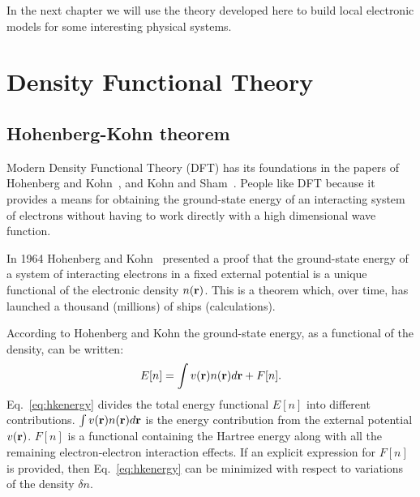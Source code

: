 In the next chapter we will use the theory developed here
to build local electronic models for some interesting 
physical systems.

\section{Density Functional Theory}
\subsection{Hohenberg-Kohn theorem}
\label{sec:hohnkohn}
Modern Density Functional Theory (DFT) has its foundations in the 
papers of Hohenberg and Kohn~\cite{hohenbergkohn64}, and Kohn and Sham~\cite{kohnsham65}.
People like DFT because it provides a means for obtaining the ground-state energy of an
interacting system of electrons without having to work directly with a high dimensional
wave function.

In 1964 Hohenberg and Kohn~\cite{hohenbergkohn64} presented a proof 
that the ground-state energy of a system of interacting electrons
in a fixed external potential is a unique functional of the 
electronic density $n({\bf r})$. This is a theorem which, over time,
has launched a thousand (millions) of ships (calculations).

According to Hohenberg and Kohn the ground-state energy, as a 
functional of the density, can be written:
%
\begin{equation}
\label{eq:hkenergy}
E[n] = \int v({\bf r}) n({\bf r})d{\bf r} + F[n].
\end{equation}
%
Eq.~\ref{eq:hkenergy} divides the total energy functional $E[n]$ into different contributions.
$\int v({\bf r})n({\bf r})d{\bf r}$ is the energy contribution from the external potential $v({\bf r})$. $F[n]$ 
is a functional containing the Hartree energy along with all
the remaining electron-electron interaction effects.
%
If an explicit expression for $F[n]$ is provided, then 
Eq.~\ref{eq:hkenergy} can be minimized with respect 
to variations of the density $\delta n$.

